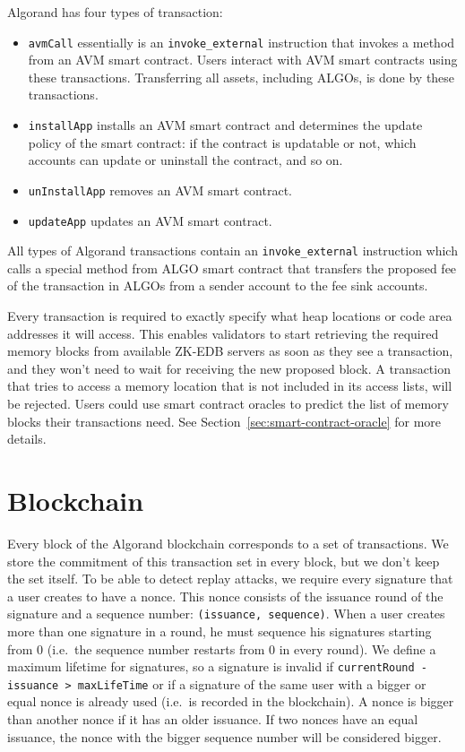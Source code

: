 \documentclass[11pt, A4]{report}
\begin{document}
    Algorand has four types of transaction:

    \begin{itemize}
        \item \texttt{avmCall} essentially is an \texttt{invoke\_external} instruction that invokes a method from an
        AVM smart contract. Users interact with AVM smart contracts using these transactions. Transferring all
        assets, including ALGOs, is done by these transactions.
        \item \texttt{installApp} installs an AVM smart contract and determines the update policy of the smart
        contract: if the contract is updatable or not, which accounts can update or uninstall the contract, and so
        on.
        \item \texttt{unInstallApp} removes an AVM smart contract.
        \item \texttt{updateApp} updates an AVM smart contract.
    \end{itemize}

    All types of Algorand transactions contain an \texttt{invoke\_external} instruction which calls a special method
    from ALGO smart contract that transfers the proposed fee of the transaction in ALGOs from a sender account to the
    fee sink accounts.

    Every transaction is required to exactly specify what heap locations or code area addresses it will access. This
    enables validators to start retrieving the required memory blocks from available ZK-EDB servers as soon as they
    see a transaction, and they won't need to wait for receiving the new proposed block. A transaction that tries to
    access a memory location that is not included in its access lists, will be rejected. Users could use smart contract
    oracles to predict the list of memory blocks their transactions need. See Section~\ref{sec:smart-contract-oracle}
    for more details.


    \section{Blockchain}\label{sec:blockchain}

    Every block of the Algorand blockchain corresponds to a set of transactions. We store the commitment of this
    transaction set in every block, but we don't keep the set itself. To be able to detect replay attacks, we require
    every signature that a user creates to have a nonce. This nonce consists of the issuance round of the signature
    and a sequence number: \texttt{(issuance,\ sequence)}. When a user creates more than one signature in a round, he
    must sequence his signatures starting from 0 (i.e.~the sequence number restarts from 0 in every round). We define
    a maximum lifetime for signatures, so a signature is invalid if \texttt{currentRound - issuance \textgreater{}\
        maxLifeTime} or if a signature of the same user with a bigger or equal nonce is already used
    (i.e.~is recorded in the blockchain). A nonce is bigger than another nonce if it has an older issuance. If two
    nonces have an equal issuance, the nonce with the bigger sequence number will be considered bigger.
\end{document}
